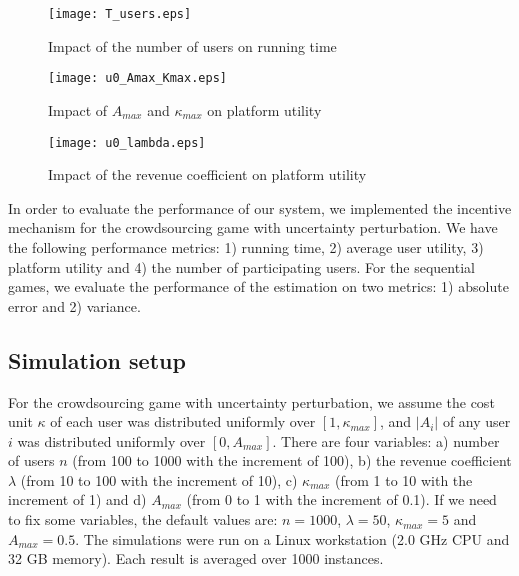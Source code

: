 \documentclass{IEEEtran}
\begin{document}
\begin{figure*}[!t]
\begin{minipage}[b]{0.3\linewidth}
	\centering
	\texttt{[image: T\_users.eps]}
	\caption{Impact of the number of users on running time}
	\label{fig:T_users}
\end{minipage}
\hspace{0.2cm}
\begin{minipage}[b]{0.3\linewidth}
	\centering
	\texttt{[image: u0\_Amax\_Kmax.eps]}
	\caption{Impact of $A_{max}$ and $\kappa_{max}$ on platform utility}
	\label{fig:u0_Amax_Kmax}
\end{minipage}
\hspace{0.2cm}
\begin{minipage}[b]{0.3\linewidth}
	\centering
	\texttt{[image: u0\_lambda.eps]}
	\caption{Impact of the revenue coefficient on platform utility}
	\label{fig:u0_lambda}
\end{minipage}
\end{figure*}

In order to evaluate the performance of our system, we implemented the incentive mechanism for the crowdsourcing game with uncertainty perturbation. We have the following performance metrics: 1) running time, 2) average user utility, 3) platform utility and 4) the number of participating users. For the sequential games, we evaluate the performance of the estimation on two metrics: 1) absolute error and 2) variance.

\subsection{Simulation setup}
For the crowdsourcing game with uncertainty perturbation, we assume the cost unit $\kappa$ of each user was distributed uniformly over $[1,\kappa_{max}]$, and $|A_i|$ of any user $i$ was distributed uniformly over $[0,A_{max}]$. There are four variables: a) number of users $n$ (from 100 to 1000 with the increment of 100), b) the revenue coefficient $\lambda$ (from 10 to 100 with the increment of 10), c) $\kappa_{max}$ (from 1 to 10 with the increment of 1) and d) $A_{max}$ (from 0 to 1 with the increment of 0.1). If we need to fix some variables, the default values are: $n=1000$, $\lambda=50$, $\kappa_{max}=5$ and $A_{max}=0.5$.
The simulations were run on a Linux workstation (2.0 GHz CPU and 32 GB memory). Each result is averaged over 1000 instances.
\end{document}
